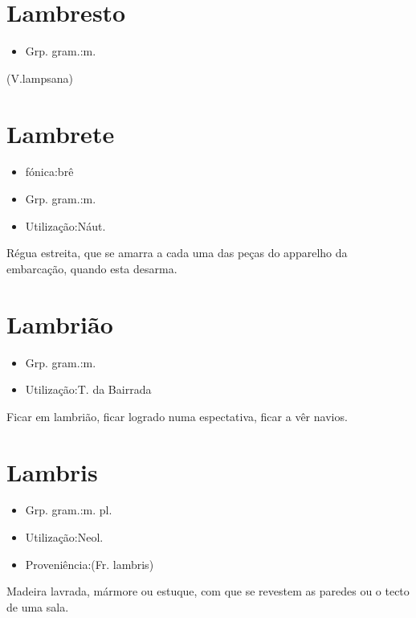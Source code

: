 \section{Lambresto}
\begin{itemize}
\item {Grp. gram.:m.}
\end{itemize}
(V.lampsana)
\section{Lambrete}
\begin{itemize}
\item {fónica:brê}
\end{itemize}
\begin{itemize}
\item {Grp. gram.:m.}
\end{itemize}
\begin{itemize}
\item {Utilização:Náut.}
\end{itemize}
Régua estreita, que se amarra a cada uma das peças do apparelho da embarcação, quando esta desarma.
\section{Lambrião}
\begin{itemize}
\item {Grp. gram.:m.}
\end{itemize}
\begin{itemize}
\item {Utilização:T. da Bairrada}
\end{itemize}
\textunderscore Ficar em lambrião\textunderscore , ficar logrado numa espectativa, ficar a vêr navios.
\section{Lambris}
\begin{itemize}
\item {Grp. gram.:m. pl.}
\end{itemize}
\begin{itemize}
\item {Utilização:Neol.}
\end{itemize}
\begin{itemize}
\item {Proveniência:(Fr. \textunderscore lambris\textunderscore )}
\end{itemize}
Madeira lavrada, mármore ou estuque, com que se revestem as paredes ou o tecto de uma sala.
